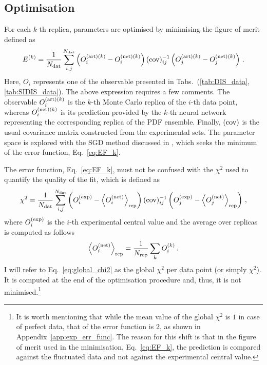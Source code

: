\subsection{Optimisation}
\label{sec:optimisation}

For each $k$-th replica, parameters are optimised by minimising the figure of merit defined as
\begin{equation}
  E^{(k)} = \frac{1}{N_{\textrm{dat}}} \sum_{i,j}^{N_{\textrm{dat}}} \left( O_{i}^{\textrm{(art)}(k)} - O_{i}^{\textrm{(net)}(k)} \right) (\textrm{cov})^{-1}_{ij} \left( O_{j}^{\textrm{(art)}(k)} - O_{j}^{\textrm{(net)}(k)} \right) \,.
  \label{eq:EF_k}
\end{equation}
Here, $O_i$ represents one of the observable presented in Tabs.~(\ref{tab:DIS_data},\ref{tab:SIDIS_data}). The above expression requires a few comments. The observable $O_{i}^{\textrm{(art)}(k)}$ is the $k$-th Monte Carlo replica of the $i$-th data point, whereas $O_{i}^{(\textrm{net})(k)}$ is its prediction provided by the $k$-th neural network representing the corresponding replica of the PDF ensemble. Finally, $\textrm{(cov)}$ is the usual covariance matrix constructed from the experimental sets. The parameter space is explored with the SGD method discussed in , which seeks the minimum of the error function, Eq.~\eqref{eq:EF_k}.%

The error function, Eq.~\eqref{eq:EF_k}, must not be confused with the $\chi^2$ used to quantify the quality of the fit, which is defined as
\begin{equation}
  \chi^2 = \frac{1}{N_{\textrm{dat}}} \sum_{i,j}^{N_{\textrm{dat}}} \left( O_{i}^{\textrm{(exp)}} - \left<O_{i}^{\textrm{(net)}}\right>_{\textrm{rep}} \right) (\textrm{cov})^{-1}_{ij} \left( O_{j}^{\textrm{(exp)}} - \left<O_{j}^{\textrm{(net)}}\right>_{\textrm{rep}} \right) \,,
  \label{eq:global_chi2}
\end{equation}
where $O_{i}^{\textrm{(exp)}}$ is the $i$-th experimental central value and the average over replicas is computed as follows
\begin{equation}
  \left< O_i^{\textrm{(net)}} \right>_{\textrm{rep}} = \frac{1}{N_{\textrm{rep}}} \sum_{k} O^{(k)}_i \,.
\end{equation}
I will refer to Eq.~\eqref{eq:global_chi2} as the global $\chi^2$ per data point (or simply $\chi^2$). It is computed at the end of the optimisation procedure and, thus, it is not minimised.\footnote{\footnotesize It is worth mentioning that while the mean value of the global $\chi^2$ is $1$ in case of perfect data, that of the error function is $2$, as shown in Appendix~\ref{app:exp_err_func}. The reason for this shift is that in the figure of merit used in the minimisation, Eq.~\eqref{eq:EF_k}, the prediction is compared against the fluctuated data and not against the experimental central value.}%


